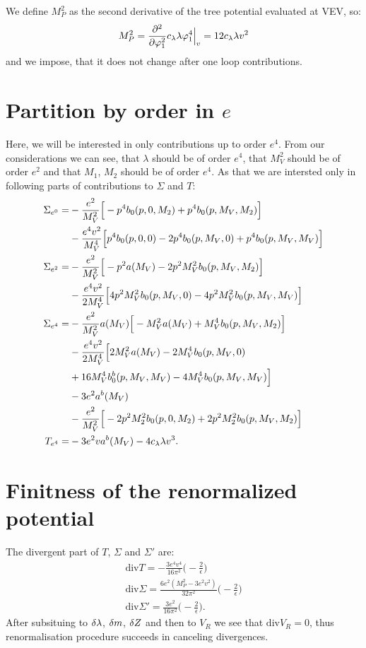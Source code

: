 We define $M_P^2$ as the second derivative of the tree potential evaluated at VEV, so:
\begin{equation}
M_P^2 = \frac{\partial^2}{\partial \varphi_1^2}c_\lambda\lambda\varphi_1^4\Big|_{v} = 12c_\lambda\lambda v^2
\end{equation}
and we impose, that it does not change after one loop contributions. \\

\section{Partition by order in \texorpdfstring{$e$}{e}}
Here, we will be interested in only contributions up to order $e^4$. From our \MSbar considerations 
we can see, that $\lambda$ should be of order $e^4$, that $M_V^2$ should be of order $e^2$ and 
that $M_1$, $M_2$ should be of order $e^4$. 
As that we are 
intersted only in following parts of contributions to $\Sigma$ and $T$:
\begin{align}
\Sigma_{e^0} = &-\frac{e^2}{M_V^2}\Big[-p^4b_0(p,0,M_2)+p^4b_0(p,M_V,M_2)\Big]\notag \\
&-\frac{e^4v^2}{M_V^4}\Big[p^4b_0(p,0,0)-2p^4b_0(p,M_V,0)+p^4b_0(p,M_V,M_V)\Big] \\
\Sigma_{e^2} = &-\frac{e^2}{M_V^2}\Big[-p^2a(M_V)-2p^2M_V^2b_0(p,M_V,M_2)\Big]\notag \\
&-\frac{e^4v^2}{2M_V^4}\Big[4p^2M_V^2b_0(p,M_V,0)-4p^2M_V^2b_0(p,M_V,M_V)\Big] \\
\Sigma_{e^4} = &-\frac{e^2}{M_V^2}a(M_V)\Big[-M_V^2a(M_V)+M_V^4b_0(p,M_V,M_2)\Big]\notag \\
&-\frac{e^4v^2}{2M_V^4}\Big[2M_V^2a(M_V)-2M_V^4b_0(p,M_V,0)\notag \\
&+16M_V^4b_0^b(p,M_V,M_V)-4M_V^4b_0(p,M_V,M_V)\Big]\notag\\
&-3e^2a^b(M_V)\notag\\
&-\frac{e^2}{M_V^2}\Big[-2p^2M_2^2b_0(p,0,M_2)+2p^2M_2^2b_0(p,M_V,M_2)\Big] \\
T_{e^4} = & -3e^2va^b(M_V)-4c_\lambda\lambda v^3.
\end{align}
\section{Finitness of the renormalized potential}
The divergent part of $T$, $\Sigma$ and $\Sigma'$ are:
\begin{align}
\textrm{div}T = -\frac{3e^4v^4}{16\pi^2}\Big(-\frac{2}{\epsilon}\Big)\\
\textrm{div}\Sigma = \frac{6e^2(M_P^2-3e^2v^2)}{32\pi^2}\Big(-\frac{2}{\epsilon}\Big)\\
\textrm{div}\Sigma' = \frac{3e^2}{16\pi^2}\Big(-\frac{2}{\epsilon}\Big).
\end{align}
After subsituing to $\delta\lambda$, $\delta m$, $\delta Z$ and then to $V_R$ we see that $\textrm{div}V_R = 0$, 
thus renormalisation procedure succeeds in canceling divergences. \\

